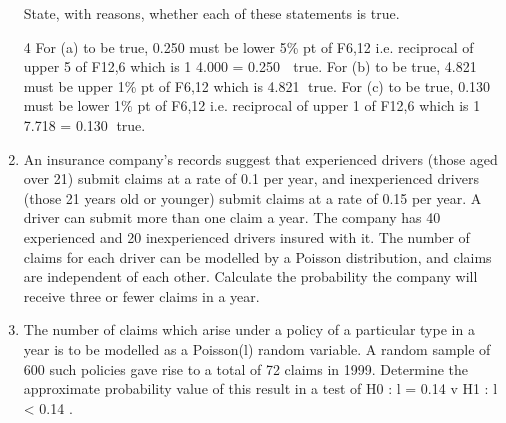 \documentclass[a4paper,12pt]{article}
\begin{document}
\begin{enumerate}
State, with reasons, whether each of these statements is true. 


4 For (a) to be true, 0.250 must be lower 5\% pt of F6,12 i.e. reciprocal of upper 5%
of F12,6 which is
1
4.000
= 0.250  true.
For (b) to be true, 4.821 must be upper 1\% pt of F6,12 which is 4.821 true.
For (c) to be true, 0.130 must be lower 1\% pt of F6,12 i.e. reciprocal of upper 1%
of F12,6 which is
1
7.718
= 0.130 true.

\newpage
\item  An insurance company’s records suggest that experienced drivers (those aged
over 21) submit claims at a rate of 0.1 per year, and inexperienced drivers
(those 21 years old or younger) submit claims at a rate of 0.15 per year. A
driver can submit more than one claim a year. The company has 40
experienced and 20 inexperienced drivers insured with it.
The number of claims for each driver can be modelled by a Poisson
distribution, and claims are independent of each other. Calculate the
probability the company will receive three or fewer claims in a year. 


\item The number of claims which arise under a policy of a particular type in a year
is to be modelled as a Poisson(l) random variable. A random sample of 600
such policies gave rise to a total of 72 claims in 1999.
Determine the approximate probability value of this result in a test of
H0 : l = 0.14 v H1 : l < 0.14 . 
\end{enumerate}





\end{document}
